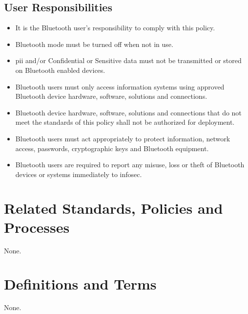 \subsection{User Responsibilities}
\begin{itemize}
\item
It is the Bluetooth user's responsibility to comply with this policy. 
\item
Bluetooth mode must be turned off when not in use.
\item
\gls{pii} and/or \CompanyName{} Confidential or Sensitive data must not be transmitted or stored on Bluetooth enabled devices. 
\item
Bluetooth users must only access \CompanyName{} information systems using approved Bluetooth device hardware, software, solutions\oxford{} and connections. 
\item
Bluetooth device hardware, software, solutions\oxford{} and connections that do not meet the standards of this policy shall not be authorized for deployment. 
\item
Bluetooth users must act appropriately to protect information, network access, passwords, cryptographic keys\oxford{} and Bluetooth equipment. 
\item
Bluetooth users are required to report any misuse, loss\oxford{} or theft of Bluetooth devices or systems immediately to \gls{infosec}.
\end{itemize}
\CommonPolicyCompliance
\section{Related Standards, Policies\oxford{} and Processes}
None.
\section{Definitions and Terms}
None.
\CommonRevisionHistory